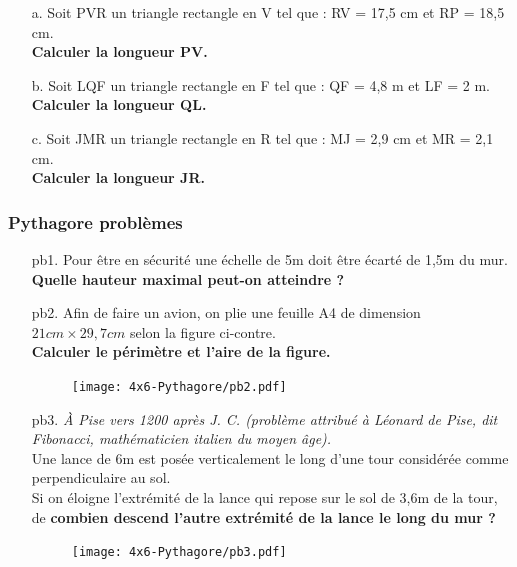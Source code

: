 \begin{multicols}{3}
\begin{enumerate}
  \item[a.]Soit PVR un triangle rectangle en V tel que : RV = 17,5 cm et RP = 18,5 cm. \\
  \textbf{Calculer la longueur PV.}

  \item[b.]Soit LQF un triangle rectangle en F tel que : QF = 4,8 m et LF = 2 m. \\
  \textbf{Calculer la longueur QL.}

  \item[c.]Soit JMR un triangle rectangle en R tel que : MJ = 2,9 cm et MR = 2,1 cm. \\
  \textbf{Calculer la longueur JR.}
\end{enumerate}
\end{multicols}

\Pointilles[14]
\newpage

\subsubsection*{Pythagore problèmes}

\begin{multicols}{2}
\begin{enumerate}
  \item[pb1.] Pour être en sécurité une échelle de 5m doit être écarté de 1,5m du mur.\\
    \textbf{Quelle hauteur maximal peut-on atteindre ?}

  \item[pb2.] Afin de faire un avion, on plie une feuille A4 de dimension $21cm \times 29,7cm$ selon la figure ci-contre.\\
    \textbf{Calculer le périmètre et l'aire de la figure.}

  \begin{figure}[H]
    \centering
    \texttt{[image: 4x6-Pythagore/pb2.pdf]}
  \end{figure}
\end{enumerate}
\end{multicols}

\begin{multicols}{2}
  \begin{enumerate}
  \item[pb3.] \textit{À Pise vers 1200 après J. C. (problème attribué à Léonard de Pise, dit Fibonacci, mathématicien italien   du moyen âge).} \\
  Une lance de 6m est posée verticalement le long d’une tour considérée comme perpendiculaire au sol. \\
  Si on éloigne l’extrémité de la lance qui repose sur le sol de 3,6m de la tour, de  \textbf{combien descend l’autre extrémité de la lance le long du mur ?}

  \begin{figure}[H]
    \centering
    \texttt{[image: 4x6-Pythagore/pb3.pdf]}
  \end{figure}
\end{enumerate}
\end{multicols}

